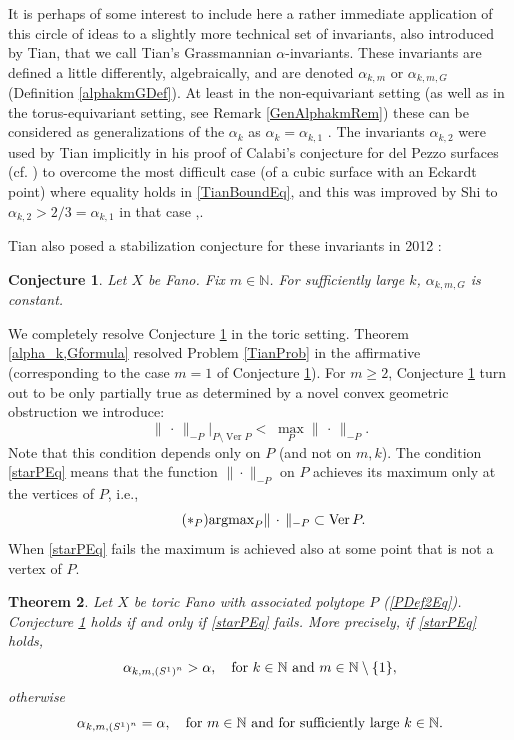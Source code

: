 \documentclass{article}
\newcommand{\NN}{{\mathbb N}}
\renewcommand{\>}{\rightarrow}
\DeclareMathOperator{\Ver}{Ver}
\theoremstyle{plain}
\newtheorem{theorem}{Theorem}[section]
\newtheorem{conjecture}[theorem]{Conjecture}
\theoremstyle{definition}
\newcommand{\beq}{\begin{equation}}
\newcommand{\eeq}{\end{equation}}
\newcommand{\bconj}{\begin{conjecture}}
\newcommand{\econj}{\end{conjecture}}
\newcommand{\bthm}{\begin{theorem}}
\newcommand{\ethm}{\end{theorem}}
\def\lb#1{\label{#1}}
\def\q{\quad}
\begin{document}
It is perhaps of some interest to include here a rather immediate application
of this circle of ideas to a slightly more technical set of invariants, 
also introduced by Tian, that we call Tian's Grassmannian $\alpha$-invariants.
These invariants are defined a little differently, algebraically,
and are denoted $\alpha_{k,m}$ or $\alpha_{k,m,G}$  (Definition \ref{alphakmGDef}).
At least in the non-equivariant setting (as well as in the torus-equivariant setting, see Remark \ref{GenAlphakmRem}) these can be considered as generalizations of the 
$\alpha_k$ as $\alpha_k=\alpha_{k,1}$ \cite{Shi10,CS08}. The invariants
$\alpha_{k,2}$ were used by Tian implicitly in his proof of Calabi's conjecture
for del Pezzo surfaces \cite[Appendix A]{Tian90} (cf. \cite[Theorem 6.1]{Tian91}) to overcome the most difficult case (of a cubic surface with an Eckardt point) where equality
holds in \eqref{TianBoundEq}, and this was improved by Shi to
$\alpha_{k,2}>2/3=\alpha_{k,1}$ in that case 
\cite[Theorem 1.3]{Shi10},\cite{Cheltsov08}.

Tian also posed a stabilization conjecture for these invariants in 2012 \cite[Conjecture 5.3]{Tian12}:

\bconj
\lb{TianGenConj}
Let $X$ be Fano.
Fix $m\in\NN$. For sufficiently large $k$, $\alpha_{k,m,G}$ is constant.
\econj

We completely resolve Conjecture \ref{TianGenConj} in the toric setting.
Theorem \ref{alpha_k,Gformula} resolved Problem \ref{TianProb}
in the affirmative (corresponding to the case $m=1$ of Conjecture \ref{TianGenConj}).
For $m\ge2$, Conjecture \ref{TianGenConj}  turn out
to be only partially true as determined by a 
novel convex geometric obstruction we introduce:
\beq
\label{starPEq}\tag{$\ast_P$}
\|\,\cdot\,\|_{-P}\Big|_{P\setminus\Ver P} 
<\;
\max_{P}\|\,\cdot\,\|_{-P}.
\eeq
Note that this condition depends only on $P$ (and not on $m,k$).
The condition \eqref{starPEq} means that 
the function $\|\cdot\|_{-P}$ on $P$ achieves its maximum 
only at the vertices of $P$, i.e.,
\beq
\label{starPequivEq}\tag{$\ast_P$}
\hbox{\rm argmax}_{P}\|\,\cdot\,\|_{-P}\subset \Ver P.
\eeq
When \eqref{starPEq} fails the
maximum is  achieved also at some point that is not a vertex of $P$.

\bthm    
\lb{SecondMainThm}
Let $X$ be toric Fano with associated polytope $P$ (\ref{PDef2Eq}). 
Conjecture \ref{TianGenConj} holds if and only if \eqref{starPEq} fails.
More precisely, if \eqref{starPEq} holds,
    \beq
    \lb{TianGenConjFailsEq}
       \alpha_{k,m,\left(S^1\right)^n}>\alpha, \q
           \hbox{for $k\in\NN$ and $m\in\NN\setminus\{1\}$},
    \eeq
otherwise
    \beq
    \lb{TianGenConjHoldsEq}
       \alpha_{k,m,\left(S^1\right)^n}=\alpha, 
       \q 
       \hbox{for $m\in\NN$ and for sufficiently large $k\in\NN$}.
    \eeq
\ethm
\end{document}
